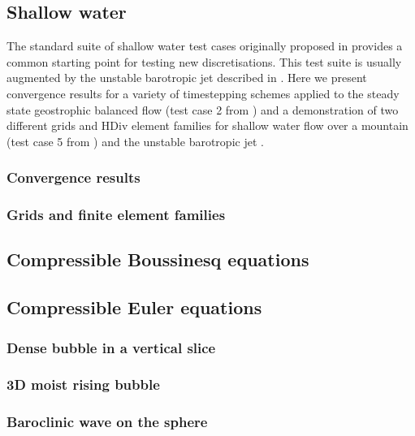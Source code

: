 \documentclass[journal abbreviation, manuscript]{copernicus}
\begin{document}
\subsection{Shallow water}
The standard suite of shallow water test cases originally proposed in
\citet{williamson1992standard} provides a common starting point for
testing new discretisations. This test suite is usually augmented by
the unstable barotropic jet described in
\citet{galewsky2004initial}. Here we present convergence results for a
variety of timestepping schemes applied to the steady state
geostrophic balanced flow (test case 2 from
\citet{williamson1992standard}) and a demonstration of two different
grids and HDiv element families for shallow water flow over a mountain
(test case 5 from \citet{williamson1992standard}) and the unstable
barotropic jet \citep{galewsky2004initial}.

\subsubsection{Convergence results}



\subsubsection{Grids and finite element families}

\subsection{Compressible Boussinesq equations}

\subsection{Compressible Euler equations}

\subsubsection{Dense bubble in a vertical slice}

\subsubsection{3D moist rising bubble}

\subsubsection{Baroclinic wave on the sphere}
\end{document}
